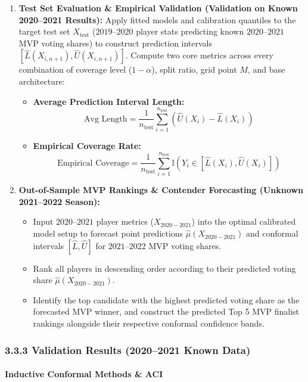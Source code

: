 \documentclass[11pt,a4paper]{article}
\begin{document}
\begin{enumerate}
    \item \textbf{Test Set Evaluation \& Empirical Validation (Validation on Known 2020--2021 Results):}
    Apply fitted models and calibration quantiles to the target test set $X_{\text{test}}$ ($2019$--$2020$ player stats predicting known $2020$--$2021$ MVP voting shares) to construct prediction intervals $[\hat{L}(X_{i, n+1}), \hat{U}(X_{i, n+1})]$. Compute two core metrics across every combination of coverage level ($1-\alpha$), split ratio, grid point $M$, and base architecture:
    \begin{itemize}
        \item \textbf{Average Prediction Interval Length:}
        \[ \text{Avg Length} = \frac{1}{n_{\text{test}}} \sum_{i=1}^{n_{\text{test}}} \left( \hat{U}(X_i) - \hat{L}(X_i) \right) \]
        \item \textbf{Empirical Coverage Rate:}
        \[ \text{Empirical Coverage} = \frac{1}{n_{\text{test}}} \sum_{i=1}^{n_{\text{test}}} \mathbb{I}\left( Y_i \in [\hat{L}(X_i), \hat{U}(X_i)] \right) \]
    \end{itemize}

    \item \textbf{Out-of-Sample MVP Rankings \& Contender Forecasting (Unknown 2021--2022 Season):}
    \begin{itemize}
        \item Input $2020$--$2021$ player metrics ($X_{2020-2021}$) into the optimal calibrated model setup to forecast point predictions $\hat{\mu}(X_{2020-2021})$ and conformal intervals $[\hat{L}, \hat{U}]$ for $2021$--$2022$ MVP voting shares.
        \item Rank all players in descending order according to their predicted voting share $\hat{\mu}(X_{2020-2021})$.
        \item Identify the top candidate with the highest predicted voting share as the forecasted MVP winner, and construct the predicted Top 5 MVP finalist rankings alongside their respective conformal confidence bands.
    \end{itemize}
\end{enumerate}

\subsubsection{3.3.3 Validation Results (2020--2021 Known Data)}

\paragraph{Inductive Conformal Methods \& ACI}
\end{document}
